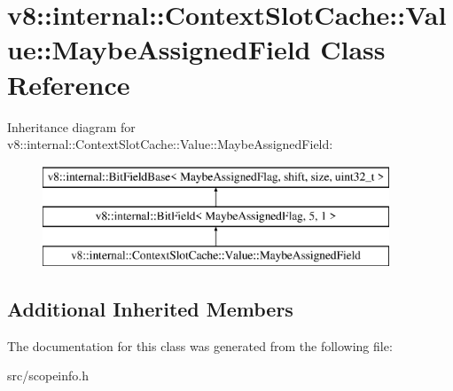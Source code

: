 \hypertarget{classv8_1_1internal_1_1_context_slot_cache_1_1_value_1_1_maybe_assigned_field}{}\section{v8\+:\+:internal\+:\+:Context\+Slot\+Cache\+:\+:Value\+:\+:Maybe\+Assigned\+Field Class Reference}
\label{classv8_1_1internal_1_1_context_slot_cache_1_1_value_1_1_maybe_assigned_field}
Inheritance diagram for v8\+:\+:internal\+:\+:Context\+Slot\+Cache\+:\+:Value\+:\+:Maybe\+Assigned\+Field\+:\begin{figure}[H]
\begin{center}
\leavevmode
\includegraphics[height=3.000000cm]{classv8_1_1internal_1_1_context_slot_cache_1_1_value_1_1_maybe_assigned_field}
\end{center}
\end{figure}
\subsection*{Additional Inherited Members}


The documentation for this class was generated from the following file\+:\begin{DoxyCompactItemize}
\item 
src/scopeinfo.\+h\end{DoxyCompactItemize}
